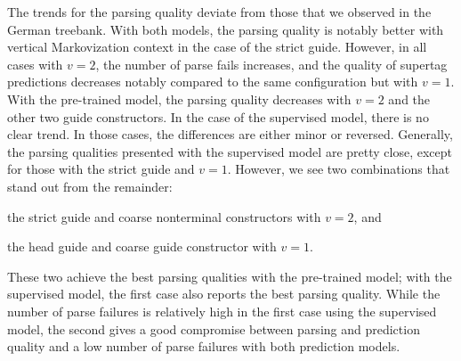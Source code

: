 \documentclass[../../document.tex]{subfiles}
\begin{document}
    The trends for the parsing quality deviate from those that we observed in the German \negra{} treebank.
    With both models, the parsing quality is notably better with vertical Markovization context in the case of the strict guide.
    However, in all cases with $v=2$, the number of parse fails increases, and the quality of supertag predictions decreases notably compared to the same configuration but with $v=1$.
    With the pre-trained model, the parsing quality decreases with $v=2$ and the other two guide constructors.
    In the case of the supervised model, there is no clear trend. In those cases, the differences are either minor or reversed.
    Generally, the parsing qualities presented with the supervised model are pretty close, except for those with the strict guide and $v=1$.
    However, we see two combinations that stand out from the remainder:
    \begin{compactitem}
        \item the strict guide and coarse nonterminal constructors with $v=2$, and
        \item the head guide and coarse guide constructor with $v=1$.
    \end{compactitem}
    These two achieve the best parsing qualities with the pre-trained model; with the supervised model, the first case also reports the best parsing quality.
    While the number of parse failures is relatively high in the first case using the supervised model, the second gives a good compromise between parsing and prediction quality and a low number of parse failures with both prediction models.
\end{document}

